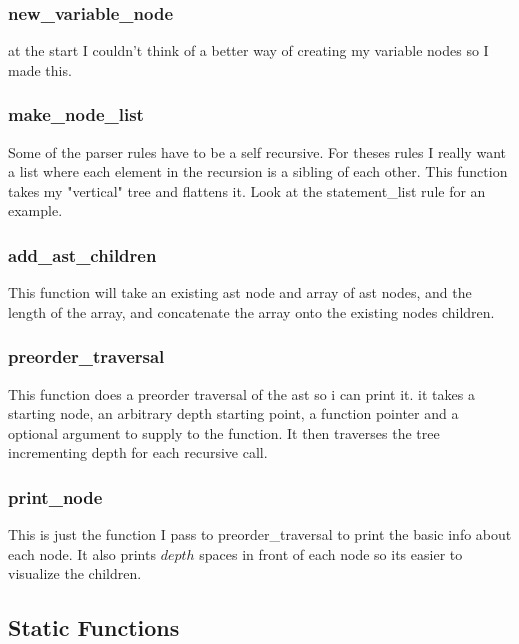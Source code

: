 \documentclass[11pt]{article}
\begin{document}
            \subsubsection{new\_variable\_node}
                at the start I couldn't think of a better way of creating my variable nodes so I made this.

            \subsubsection{make\_node\_list}
                Some of the parser rules have to be a self recursive. For theses
                rules I really want a list where each element in the recursion is a sibling
                of each other. This function takes my "vertical" tree and flattens it. 
                Look at the  statement\_list rule for an example.

            \subsubsection{add\_ast\_children}
                This function will take an existing ast node and array of ast nodes, and the
                length of the array, and concatenate the array onto the existing nodes children.

            \subsubsection{preorder\_traversal}
                This function does a preorder traversal of the ast so i can print it. it takes a starting node,
                an arbitrary depth starting point, a function pointer and a optional argument to supply to the
                function. It then traverses the tree incrementing depth for each recursive call.

            \subsubsection{print\_node}
                This is just the function I pass to preorder\_traversal to print the basic info about each node.
                It also prints $depth$ spaces in front of each node so its easier to visualize the children.

        \subsection{Static Functions}
\end{document}
